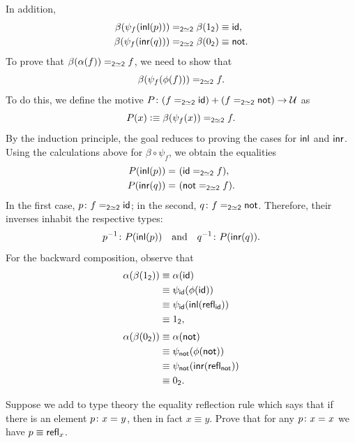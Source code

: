 \begin{solution}
    In addition,
    \begin{align*}
        \beta(\psi_f(\mathsf{inl}(p)))
            &\mathrel{=_{\mathsf{2}\simeq\mathsf{2}}}\beta(1_{\mathsf{2}})
            \equiv\mathsf{id},\\
        \beta(\psi_f(\mathsf{inr}(q)))
            &\mathrel{=_{\mathsf{2}\simeq\mathsf{2}}}\beta(0_{\mathsf{2}})
            \equiv\mathsf{not}.
    \end{align*}
    To prove that $\beta(\alpha(f))\mathrel{=_{\mathsf{2}\simeq\mathsf{2}}}f$, we need to show that
    \[
        \beta(\psi_f(\phi(f)))\mathrel{=_{\mathsf{2}\simeq\mathsf{2}}}f.
    \]
    To do this, we define the motive $P\colon(f\eq{\fun2\simeq\fun2}\id)+(f\eq{\fun2\simeq\fun2}\fun{not})\to\univ$ as
    \[
        P(x)\mathrel{\vcentcolon}\equiv\beta(\psi_f(x))\mathrel{=_{\mathsf{2}\simeq\mathsf{2}}}f.
    \]
    By the induction principle, the goal reduces to proving the cases for $\mathsf{inl}$ and $\mathsf{inr}$. Using the calculations above for $\beta\circ\psi_f$, we obtain the equalities
    \begin{align*}
        P(\mathsf{inl}(p))&\mathrel{=_{}}(\mathsf{id}\mathrel{=_{\mathsf{2}\simeq\mathsf{2}}}f),\\
        P(\mathsf{inr}(q))&\mathrel{=_{}}(\mathsf{not}\mathrel{=_{\mathsf{2}\simeq\mathsf{2}}}f).
    \end{align*}
    In the first case, $p\colon f\eq{\fun2\simeq\fun2}\id$; in the second, $q\colon f\eq{\fun2\simeq\fun2}\fun{not}$. Therefore, their inverses inhabit the respective types:
    \[
        p^{-1}\colon P(\fun{inl}(p))
        \quad\text{and}\quad
        q^{-1}\colon P(\fun{inr}(q)).
    \]
    For the backward composition, observe that
    \begin{align*}
        \alpha(\beta(1_{\mathsf{2}}))
            &\equiv\alpha(\mathsf{id})\\
            &\equiv\psi_{\mathsf{id}}(\phi(\mathsf{id}))\\
            &\equiv\psi_{\mathsf{id}}(\mathsf{inl}(\mathsf{refl}_{\mathsf{id}}))\\
            &\equiv1_{\mathsf{2}},\\[1mm]
        \alpha(\beta(0_{\mathsf{2}}))
            &\equiv\alpha(\mathsf{not})\\
            &\equiv\psi_{\mathsf{not}}(\phi(\mathsf{not}))\\
            &\equiv
                \psi_{\mathsf{not}}(\mathsf{inr}(\mathsf{refl}_{\mathsf{not}}))\\
            &\equiv0_{\mathsf{2}}.
    \end{align*}
\end{solution}

\begin{exr}
    Suppose we add to type theory the equality reflection rule which says that if there is an element\/ $p\colon x\eq{}y$, then in fact\/ $x\equiv y$. Prove that for any\/ $p\colon x\eq{}x$ we have\/ $p\equiv\mathsf{refl}_x$.
\end{exr}

